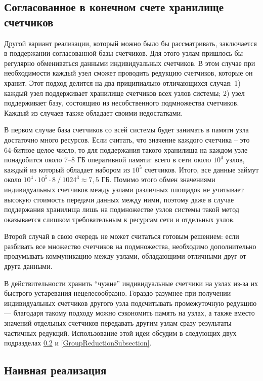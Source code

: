 \subsection{Согласованное в конечном счете хранилище счетчиков}
\label{EventuallyConsistentMathodSubsection}

Другой вариант реализации, который можно было бы рассматривать, заключается в поддержании согласованной базы счетчиков. Для этого узлам пришлось бы регулярно обмениваться данными индивидуальных счетчиков. В этом случае при необходимости каждый узел сможет проводить редукцию счетчиков, которые он хранит. Этот подход делится на два приципиально отличающихся случая: 1) каждый узел поддерживает хранилище счетчиков всех узлов системы; 2) узел поддерживает базу, состоящию из несобственного подмножества счетчиков. Каждый из случаев также обладает своими недостатками.

В первом случае база счетчиков со всей системы будет занимать в памяти узла достаточно много ресурсов. Если считать, что значение каждого счетчика -- это 64-битное целое число, то для поддержания такого хранилища на каждом узле понадобится около 7--8 ГБ оперативной памяти: всего в сети около $10^4$ узлов, каждый из который обладает набором из $10^5$ счетчиков. Итого, все данные займут около $10^4 \cdot 10^5 \cdot 8\ /\ 1024^3 \approx 7,5$ ГБ. Помимо этого обмен значениями индивидуальных счетчиков между узлами различных площадок не учитывает высокую стоимость передачи данных между ними, поэтому даже в случае поддержания хранилища лишь на подмножестве узлов системы такой метод оказывается слишком требовательным к ресурсам сети и отдельных узлов.

Второй случай в свою очередь не может считаться готовым решением: если разбивать все множество счетчиков на подмножества, необходимо дополнительно продумывать коммуникацию между узлами, обладающими отличными друг от друга данными.

В действительности хранить \enquote{чужие} индивидуальные счетчики на узлах из-за их быстрого устаревания нецелесообразно. Гораздо разумнее при получении индивидуальных счетчиков другого узла подсчитывать промежуточную редукцию --- благодаря такому подходу можно сэкономить память на узлах, а также вместо значений отдельных счетчиков передавать другим узлам сразу результаты частичных редукций. Использование этой идеи обсудим в следующих двух подразделах \ref{NaiveImplementationSubsection} и \ref{GroupReductionSubsection}.

\subsection{Наивная реализация}
\label{NaiveImplementationSubsection}

